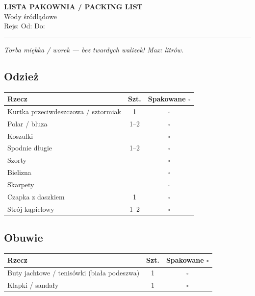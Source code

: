 \documentclass[a4paper,11pt]{article}
\begin{document}

\begin{center}
    {\Large\bfseries\color{pzzblue} LISTA PAKOWNIA / PACKING LIST}\\
    {\large Wody śródlądowe}\\[4pt]
    {\small Rejs: \field{5cm} \quad Od: \field{3cm} \quad Do: \field{3cm}}
\end{center}

\vspace{0.3cm}
\noindent\rule{\linewidth}{1pt}

\noindent\textit{Torba miękka / worek — bez twardych walizek! Max: \field{2cm} litrów.}

\vspace{0.2cm}

\subsection*{Odzież}
\begin{tabularx}{\linewidth}{|X|c|c|}
\hline
\textbf{Rzecz} & \textbf{Szt.} & \textbf{Spakowane \(\square\)} \\
\hline
Kurtka przeciwdeszczowa / sztormiak & 1 & \(\square\) \\[4pt]\hline
Polar / bluza & 1--2 & \(\square\) \\[4pt]\hline
Koszulki & & \(\square\) \\[4pt]\hline
Spodnie długie & 1--2 & \(\square\) \\[4pt]\hline
Szorty & & \(\square\) \\[4pt]\hline
Bielizna & & \(\square\) \\[4pt]\hline
Skarpety & & \(\square\) \\[4pt]\hline
Czapka z daszkiem & 1 & \(\square\) \\[4pt]\hline
Strój kąpielowy & 1--2 & \(\square\) \\[4pt]\hline
\end{tabularx}

\vspace{0.3cm}

\subsection*{Obuwie}
\begin{tabularx}{\linewidth}{|X|c|c|}
\hline
\textbf{Rzecz} & \textbf{Szt.} & \textbf{Spakowane \(\square\)} \\
\hline
Buty jachtowe / tenisówki (biała podeszwa) & 1 & \(\square\) \\[4pt]\hline
Klapki / sandały & 1 & \(\square\) \\[4pt]\hline
\end{tabularx}
\end{document}
